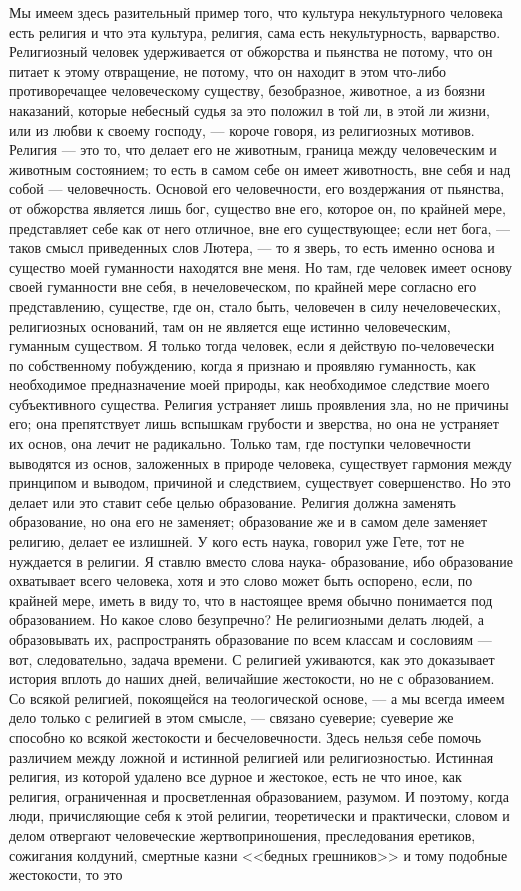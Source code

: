 \documentclass[12pt]{article}
\begin{document}
Мы имеем здесь разительный пример того, что культура некультурного человека есть религия и что эта культура, религия, сама есть некультурность, варварство. Религиозный человек удерживается от обжорства и пьянства не потому, что он питает к этому отвращение, не потому, что он находит в этом что-либо противоречащее человеческому существу, безобразное, животное, а из боязни наказаний, которые небесный судья за это положил в той ли, в этой ли жизни, или из любви к своему господу, --- короче говоря, из религиозных мотивов. Религия --- это то, что делает его не животным, граница между человеческим и животным состоянием; то есть в самом себе он имеет животность, вне себя и над собой --- человечность. Основой его человечности, его воздержания от пьянства, от обжорства является лишь бог, существо вне его, которое он, по крайней мере, представляет себе как от него отличное, вне его существующее; если нет бога, --- таков смысл приведенных слов Лютера, --- то я зверь, то есть именно основа и существо моей гуманности находятся вне меня. Но там, где человек имеет основу своей гуманности вне себя, в нечеловеческом, по крайней мере согласно его представлению, существе, где он, стало быть, человечен в силу нечеловеческих, религиозных оснований, там он не является еще истинно человеческим, гуманным существом. Я только тогда человек, если я действую по-человечески по собственному побуждению, когда я признаю и проявляю гуманность, как необходимое предназначение моей природы, как необходимое следствие моего субъективного существа. Религия устраняет лишь проявления зла, но не причины его; она препятствует лишь вспышкам грубости и зверства, но она не устраняет их основ, она лечит не радикально. Только там, где поступки человечности выводятся из основ, заложенных в природе человека, существует гармония между принципом и выводом, причиной и следствием, существует совершенство. Но это делает или это ставит себе целью образование. Религия должна заменять образование, но она его не заменяет; образование же и в самом деле заменяет религию, делает ее излишней. У кого есть наука, говорил уже Гете, тот не нуждается в религии. Я ставлю вместо слова наука- образование, ибо образование охватывает всего человека, хотя и это слово может быть оспорено, если, по крайней мере, иметь в виду то, что в настоящее время обычно понимается под образованием. Но какое слово безупречно? Не религиозными делать людей, а образовывать их, распространять образование по всем классам и сословиям --- вот, следовательно, задача времени. С религией уживаются, как это доказывает история вплоть до наших дней, величайшие жестокости, но не с образованием. Со всякой религией, покоящейся на теологической основе, --- а мы всегда имеем дело только с религией в этом смысле, --- связано суеверие; суеверие же способно ко всякой жестокости и бесчеловечности. Здесь нельзя себе помочь различием между ложной и истинной религией или религиозностью. Истинная религия, из которой удалено все дурное и жестокое, есть не что иное, как религия, ограниченная и просветленная образованием, разумом. И поэтому, когда люди, причисляющие себя к этой религии, теоретически и практически, словом и делом отвергают человеческие жертвоприношения, преследования еретиков, сожигания колдуний, смертные казни <<бедных грешников>> и тому подобные жестокости, то это 
\end{document}
